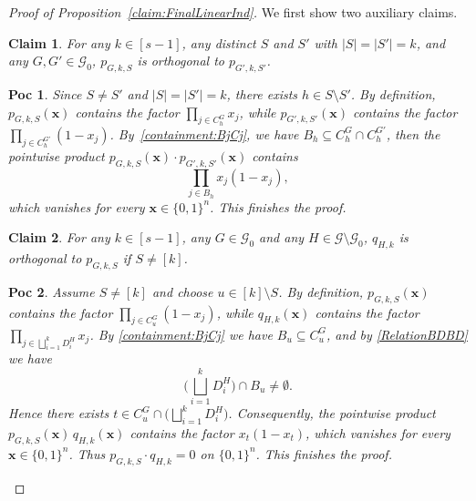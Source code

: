 \documentclass[10pt,a4paper]{amsart}
\newtheorem{claim}{Claim}
\newtheorem{poc}{Poc}
\begin{document}
\begin{proof}[Proof of Proposition~\ref{claim:FinalLinearInd}]
We first show two auxiliary claims.
\begin{claim}\label{claim:PPPP}
   For any \(k\in [s-1]\), any distinct \(S\) and \(S'\) with \(|S|=|S'|=k\), and any \(G,G'\in\mathcal{G}_{0}\), \(p_{G,k,S}\) is orthogonal to \(p_{G',k,S'}\).
\end{claim}
\begin{poc}
    {Since \(S\neq S'\) and \(|S|=|S'|=k\), there exists \(h\in S\setminus S'\).
By definition, \(p_{G,k,S}(\bm{x})\) contains the factor \(\prod_{j\in C_h^{G}} x_j\), while \(p_{G',k,S'}(\bm{x})\) contains the factor \(\prod_{j\in C_h^{G'}} (1-x_j)\).
By~\eqref{containment:BjCj}, we have \(B_h\subseteq C_h^{G}\cap C_h^{G'}\), then the pointwise product \(p_{G,k,S}(\bm{x})\cdot p_{G',k,S'}(\bm{x})\) contains
\[
\prod_{j\in B_h} x_j(1-x_j),
\]
which vanishes for every \(\bm{x}\in\{0,1\}^n\).
This finishes the proof.}
\end{poc}
\begin{claim}\label{Claim:PQPQ}
    For any \(k\in [s-1]\), any \(G\in\mathcal{G}_{0}\) and any $H\in \mathcal{G}\setminus \mathcal{G}_{0}$, 
     $q_{H,k}$ is orthogonal to $p_{G,k,S}$ if $S\neq [k]$.
\end{claim}
\begin{poc}
    { Assume \(S\neq [k]\) and choose \(u\in [k]\setminus S\).
By definition, \(p_{G,k,S}(\bm{x})\) contains the factor \(\prod_{j\in C_u^{G}} (1-x_j)\),
while \(q_{H,k}(\bm{x})\) contains the factor \(\prod_{j\in \bigsqcup_{i=1}^{k} D_i^{H}} x_j\).
By \eqref{containment:BjCj} we have \(B_u\subseteq C_u^{G}\), and by \eqref{RelationBDBD} we have
\[
\bigg(\bigsqcup_{i=1}^{k} D_i^{H}\bigg)\cap B_u \neq \emptyset .
\]
Hence there exists \(t\in C_u^{G}\cap \big(\bigsqcup_{i=1}^{k} D_i^{H}\big)\).
Consequently, the pointwise product \(p_{G,k,S}(\bm{x})\, q_{H,k}(\bm{x})\) contains the factor
\(x_t(1-x_t)\), which vanishes for every \(\bm{x}\in\{0,1\}^n\).
Thus \(p_{G,k,S}\cdot q_{H,k}= 0\) on \(\{0,1\}^n\). This finishes the proof.}
\end{poc}


\end{proof}
\end{document}
